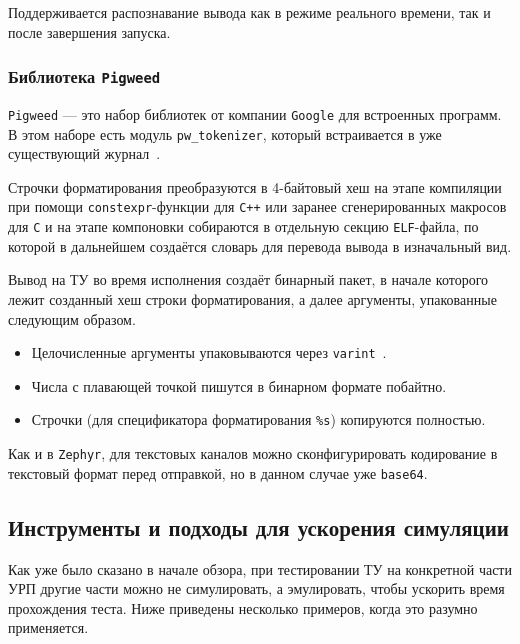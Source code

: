Поддерживается распознавание вывода как в режиме реального времени, так и после завершения запуска.

\subsubsection{Библиотека \texttt{Pigweed}}

\texttt{Pigweed} --- это набор библиотек от компании \texttt{Google} для встроенных программ. В этом наборе есть модуль \texttt{pw\_tokenizer}, который встраивается в уже существующий журнал~\cite{PwTokenizer}.

Строчки форматирования преобразуются в 4-байтовый хеш на этапе компиляции при помощи \texttt{constexpr}-функции для \texttt{C++} или заранее сгенерированных макросов для \texttt{C} и на этапе компоновки собираются в отдельную секцию \texttt{ELF}-файла, по которой в дальнейшем создаётся словарь для перевода вывода в изначальный вид.

Вывод на ТУ во время исполнения создаёт бинарный пакет, в начале которого лежит созданный хеш строки форматирования, а далее аргументы, упакованные следующим образом.
\begin{itemize}
    \item Целочисленные аргументы упаковываются через \texttt{varint}~\cite{ProtobufEncoding}.
    \item Числа с плавающей точкой пишутся в бинарном формате побайтно.
    \item Строчки (для спецификатора форматирования \texttt{\%s}) копируются полностью.
\end{itemize}

Как и в \texttt{Zephyr}, для текстовых каналов можно сконфигурировать кодирование в текстовый формат перед отправкой, но в данном случае уже \texttt{base64}.


\subsection{Инструменты и подходы для ускорения симуляции}
\label{sec:sim-accel}

Как уже было сказано в начале обзора, при тестировании ТУ на конкретной части УРП другие части можно не симулировать, а эмулировать, чтобы ускорить время прохождения теста.
Ниже приведены несколько примеров, когда это разумно применяется.


